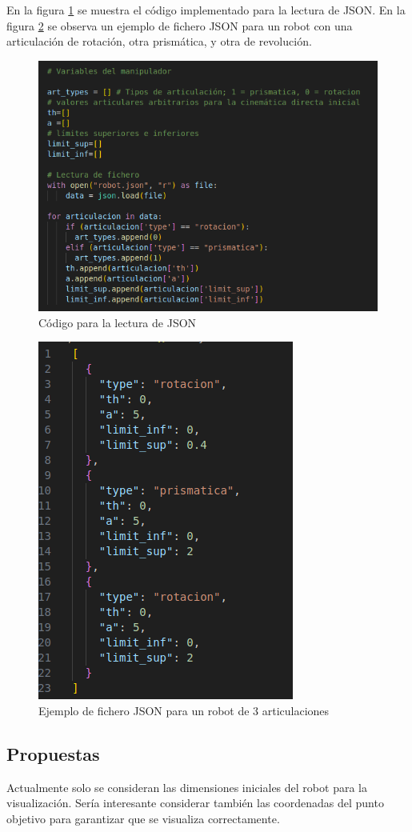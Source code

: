En la figura \ref{chapter:code_ccd3} se muestra el código implementado para la lectura de JSON. En la figura \ref{chapter:ccd_json1} se observa un ejemplo de fichero JSON para un robot con una articulación de rotación, otra prismática, y otra de revolución.
\begin{figure}[htb]
   \centering
   \includegraphics[width=.8\linewidth]{images/ccd_3.png}
   \caption{Código para la lectura de JSON}
   \label{chapter:code_ccd3}
\end{figure}
\begin{figure}[htb]
   \centering
   \includegraphics[width=.4\linewidth]{images/ccd_json1.png}
   \caption{Ejemplo de fichero JSON para un robot de 3 articulaciones}
   \label{chapter:ccd_json1}
\end{figure}


\subsection{Propuestas}
Actualmente solo se consideran las dimensiones iniciales del robot para la visualización. Sería interesante considerar también las coordenadas del punto objetivo para garantizar que se visualiza correctamente.

